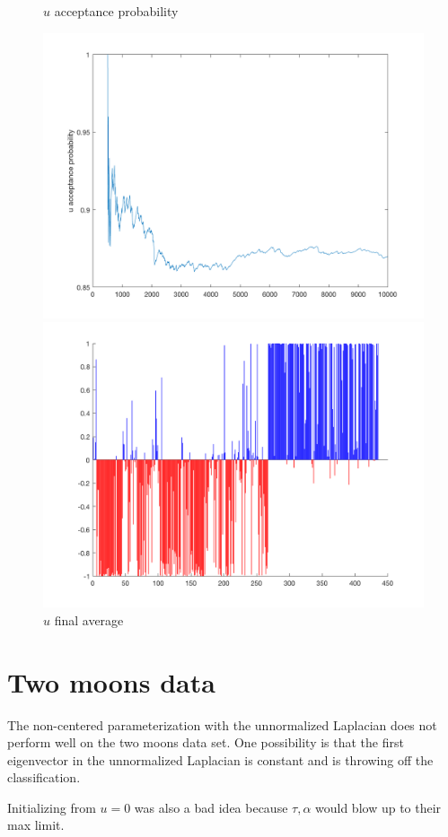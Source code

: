 \documentclass{siamart1116}
\begin{document}
\begin{figure}[!htb]
    \begin{minipage}{0.48\textwidth}
        \centering
        \caption{\label{fig:xi_5} $u$ acceptance probability}
        \includegraphics[width=\linewidth]{graphics/centered/acceptance_u_probability.png}
    \end{minipage} \hfill
    \begin{minipage}{0.48\textwidth}
        \centering
        \caption{\label{fig:xi_6} $u$ final average}
        \includegraphics[width=\linewidth]{graphics/centered/final_avg.png}
    \end{minipage}
\end{figure}
\section{Two moons data}
The non-centered parameterization with the unnormalized Laplacian does not perform well on the two moons data set. One possibility is that the first eigenvector in the unnormalized Laplacian is constant and is throwing off the classification. %

Initializing from $u=0$ was also a bad idea because $\tau, \alpha$ would blow up to their max limit.
\end{document}
